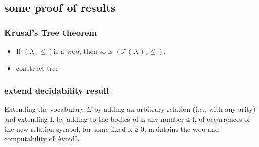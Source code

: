 \subsection{some proof of results}
\begin{frame}
    \frametitle{Krusal's Tree theorem}
    \begin{itemize}
        \item If $(X,\le)$is a wqo, then so is $(\mathcal{T}(X),\le)$.
        \item construct tree
    \end{itemize}
\end{frame}
\begin{frame}
    \frametitle{extend decidability result}
    \begin{corollary}
        Extending the vocabulary $\varSigma $ by adding an arbitrary relation (i.e., with any arity) and extending L by adding to the bodies of L any number ≤ k of occurrences of the new relation symbol, for some fixed k ≥ 0, maintains the wqo and computability of AvoidL.
    \end{corollary}
\end{frame}
